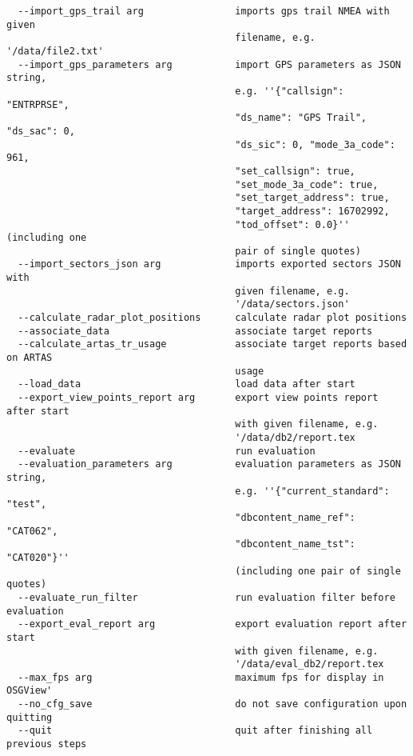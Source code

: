 \begin{lstlisting}
  --import_gps_trail arg                imports gps trail NMEA with given 
                                        filename, e.g. '/data/file2.txt'
  --import_gps_parameters arg           import GPS parameters as JSON string, 
                                        e.g. ''{"callsign": "ENTRPRSE", 
                                        "ds_name": "GPS Trail", "ds_sac": 0, 
                                        "ds_sic": 0, "mode_3a_code": 961, 
                                        "set_callsign": true, 
                                        "set_mode_3a_code": true, 
                                        "set_target_address": true, 
                                        "target_address": 16702992, 
                                        "tod_offset": 0.0}'' (including one 
                                        pair of single quotes)
  --import_sectors_json arg             imports exported sectors JSON with 
                                        given filename, e.g. 
                                        '/data/sectors.json'
  --calculate_radar_plot_positions      calculate radar plot positions
  --associate_data                      associate target reports
  --calculate_artas_tr_usage            associate target reports based on ARTAS
                                        usage  
  --load_data                           load data after start
  --export_view_points_report arg       export view points report after start 
                                        with given filename, e.g. 
                                        '/data/db2/report.tex
  --evaluate                            run evaluation
  --evaluation_parameters arg           evaluation parameters as JSON string, 
                                        e.g. ''{"current_standard": "test", 
                                        "dbcontent_name_ref": "CAT062", 
                                        "dbcontent_name_tst": "CAT020"}'' 
                                        (including one pair of single quotes)
  --evaluate_run_filter                 run evaluation filter before evaluation
  --export_eval_report arg              export evaluation report after start 
                                        with given filename, e.g. 
                                        '/data/eval_db2/report.tex
  --max_fps arg                         maximum fps for display in OSGView'
  --no_cfg_save                         do not save configuration upon quitting
  --quit                                quit after finishing all previous steps

\end{lstlisting}
\ \\


